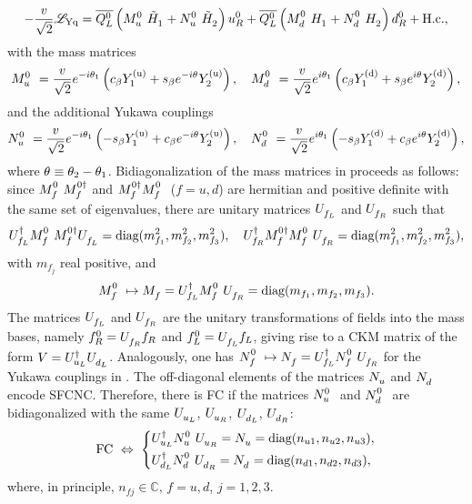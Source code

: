 \documentclass[12pt,a4paper]{article}
\begin{document}
\begin{equation}\label{eq:LYuk:01}
 -\frac{\vev{}}{\sqrt 2}\mathscr L_{\rm{Yq}}=\wQLb\left(\wMU\HSDC{1}+\wNU\HSDC{2}\right)\wUR+\wQLb\left(\wMD\HSD{1}+\wND\HSD{2}\right)\wDR+\Hc,
\end{equation}
with the mass matrices
\begin{equation}\label{eq:MassMatrices:00}
 \wMU=\frac{\vev{}}{\sqrt 2}e^{-i\vevPh{1}}\left(\Cb\YU{1}+\Sb e^{-i\vevPh{}}\YU{2}\right),\quad 
 \wMD=\frac{\vev{}}{\sqrt 2}e^{i\vevPh{1}}\left(\Cb\YD{1}+\Sb e^{i\vevPh{}}\YD{2}\right),
\end{equation}
and the additional Yukawa couplings
\begin{equation}\label{eq:NMatrices:00}
\wNU=\frac{\vev{}}{\sqrt 2}e^{-i\vevPh{1}}\left(-\Sb\YU{1}+\Cb e^{-i\vevPh{}}\YU{2}\right),\quad 
\wND=\frac{\vev{}}{\sqrt 2}e^{i\vevPh{1}}\left(-\Sb\YD{1}+\Cb e^{i\vevPh{}}\YD{2}\right),
\end{equation}
where $\theta_{}\equiv\theta_{2}-\theta_{1}$. Bidiagonalization of the mass matrices in  proceeds as follows: since $\wMatM{f}\wMatMd{f}$ and $\wMatMd{f}\wMatM{f}$ ($f=u,d$) are hermitian and positive definite with the same set of eigenvalues, there are unitary matrices $\MatUL{f}$ and $\MatUR{f}$ such that
\begin{equation}
\MatULd{f}\wMatM{f}\wMatMd{f}\MatUL{f} =\text{diag}(m_{f_1}^2,m_{f_2}^2,m_{f_3}^2),\quad \MatURd{f}\wMatMd{f}\wMatM{f}\MatUR{f}=\text{diag}(m_{f_1}^2,m_{f_2}^2,m_{f_3}^2),
\end{equation}
with $m_{f_j}$ real positive, and
\begin{equation}
\wMatM{f}\mapsto\MatM{f}=\MatULd{f}\wMatM{f}\MatUR{f}=\text{diag}(m_{f_1},m_{f_2},m_{f_3}).
\end{equation}
The matrices $\MatUL{f}$ and $\MatUR{f}$ are the unitary transformations of fields into the mass bases, namely $f_R^0=\MatUR{f}f_R$ and $f_L^0=\MatUL{f}f_L$, giving rise to a CKM matrix of the form $V=\ULUd\ULD$. Analogously, one has $\wMatN{f}\mapsto\MatN{f}=\MatULd{f}\wMatN{f}\MatUR{f}$ for the Yukawa couplings in . The off-diagonal elements of the matrices $\mNU$ and $\mND$ encode SFCNC. Therefore, there is FC if the matrices $\wNU$ and $\wND$ are bidiagonalized with the same $\ULU$, $\URU$, $\ULD$, $\URD$:
\begin{equation}
 \text{FC}\ \Leftrightarrow\ \left\{\begin{aligned} & \ULUd\wNU\URU=\mNU=\text{diag}(n_{u1},n_{u2},n_{u3}),\\ & \ULDd\wND\URD=\mND=\text{diag}(n_{d1},n_{d2},n_{d3}),\end{aligned}\right.
\end{equation}
where, in principle, $n_{fj}\in\mathbb{C}$, $f=u,d$, $j=1,2,3$.
\end{document}
